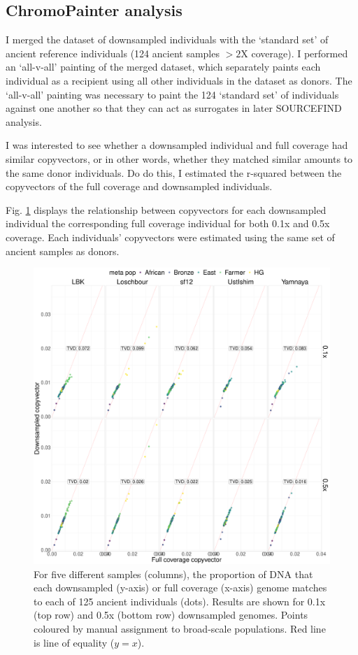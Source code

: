 \subsection{ChromoPainter analysis}

I merged the dataset of downsampled individuals with the `standard set' of ancient reference individuals (124 ancient samples $>2$X coverage). I performed an `all-v-all' painting of the merged dataset, which separately paints each individual as a recipient using all other individuals in the dataset as donors. The `all-v-all' painting was necessary to paint the 124 `standard set' of individuals against one another so that they can act as surrogates in later SOURCEFIND analysis. 

I was interested to see whether a downsampled individual and full coverage had similar copyvectors, or in other words, whether they matched similar amounts to the same donor individuals. Do do this, I estimated the r-squared between the copyvectors of the full coverage and downsampled individuals.

Fig. \ref{fig:CP_correlation_allSamples_0.1x_0.5x_30x} displays the relationship between copyvectors for each downsampled individual the corresponding full coverage individual for both 0.1x and 0.5x coverage. Each individuals' copyvectors were estimated using the same set of ancient samples as donors.

\begin{figure}[htp]
    \centering
    \includegraphics[width=1.0\textwidth]{../images/chapter1/CP_correlation_allSamples_0.1x_0.5x_30x.pdf}
    \caption{For five different samples (columns), the proportion of DNA that each downsampled (y-axis) or full coverage (x-axis) genome matches to each of 125 ancient individuals (dots). Results are shown for 0.1x (top row) and 0.5x (bottom row) downsampled genomes. Points coloured by manual assignment to broad-scale populations. Red line is line of equality ($y=x$).}
    \label{fig:CP_correlation_allSamples_0.1x_0.5x_30x}
\end{figure}


